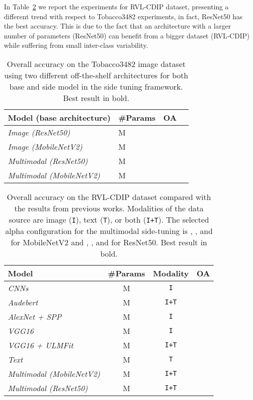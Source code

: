 In Table~\ref{tab:exp_overall_acc_rvl} we report the experiments for RVL-CDIP dataset, presenting a different trend with respect to Tobacco3482 experiments, in fact, ResNet50 has the best accuracy.
This is due to the fact that an architecture with a larger number of parameters (ResNet50) can benefit from a bigger dataset (RVL-CDIP) while suffering from small inter-class variability.
\begin{table}[t]
    \caption{Overall accuracy on the Tobacco3482 image dataset using two different off-the-shelf architectures for both base and side model in the side tuning framework. Best result in bold.}\label{tab:exp_architectures}
    \centering
    \begin{tabular}{llcc}
        \toprule
        \bfseries Model (base architecture) & \bfseries \#Params & \bfseries OA \\ 
        \midrule
        \textit{Image (ResNet50)} & M &  \\
        \textit{Image (MobileNetV2)} & M &  \\    
        \midrule
        \textit{Multimodal (ResNet50)} & M &  \\
        \textit{Multimodal (MobileNetV2)} & M &  \\    
        \bottomrule
    \end{tabular}
\end{table}
\begin{table}[t]
    \caption{Overall accuracy on the RVL-CDIP dataset compared with the results from previous works. Modalities of the data source are  image (\texttt{I}), text (\texttt{T}), or both (\texttt{I+T}). The selected alpha configuration  for the multimodal side-tuning is , , and  for MobileNetV2 and , , and  for ResNet50. Best result in bold.}\label{tab:exp_overall_acc_rvl}
    \centering
    \begin{tabular}{lccl}
        \toprule
        \bfseries Model & \bfseries \#Params & \bfseries Modality & \bfseries OA \\
        \midrule
        \textit{CNNs}~\cite{7333910} & M & \texttt{I} &  \\
        \textit{Audebert}~\cite{audebert} & M & \texttt{I+T} &  \\
        \textit{AlexNet + SPP}~\cite{8270002} & M & \texttt{I} & \\
        \textit{VGG16}~\cite{8270080} & M & \texttt{I} &  \\
        \textit{VGG16 + ULMFit}~\cite{8977998} & M & \texttt{I+T} &  \\
        \midrule
        \textit{Text} & M & \texttt{T} &  \\
        \textit{Multimodal (MobileNetV2)} & M & \texttt{I+T} &  \\    
        \textit{Multimodal (ResNet50)} & M & \texttt{I+T} &  \\
       \bottomrule
    \end{tabular}
\end{table}
